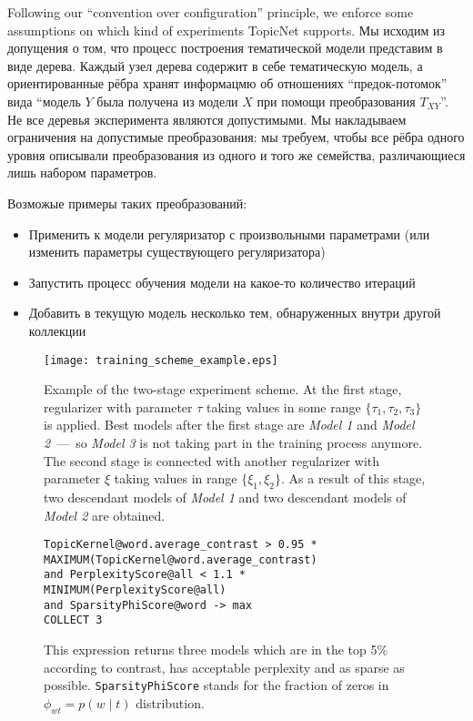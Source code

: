 Following our ``convention over configuration'' principle, we enforce some assumptions on which kind of experiments TopicNet supports. 
Мы исходим из допущения о том, что процесс построения тематической модели представим в виде дерева. Каждый узел дерева содержит в себе тематическую модель, а ориентированные рёбра хранят информацмю об отношениях ``предок-потомок'' вида ``модель $Y$ была получена из модели $X$ при помощи преобразования $T_{XY}$''. Не все деревья эксперимента являются допустимыми. Мы накладываем ограничения на допустимые преобразования: мы требуем, чтобы все рёбра одного уровня описывали преобразования из одного и того же семейства, различающиеся лишь набором параметров. 

\newpage 
Возможые примеры таких преобразований:

\begin{itemize}
    \item Применить к модели регуляризатор с произвольными параметрами (или изменить параметры существующего регуляризатора)
    \item Запустить процесс обучения модели на какое-то количество итераций
    \item Добавить в текущую модель несколько тем, обнаруженных внутри другой коллекции
\end{itemize}

\begin{figure}[t]
    \centering
    \texttt{[image: training\_scheme\_example.eps]}
    \caption{
        Example of the two-stage experiment scheme.
        At the first stage, regularizer with parameter $\tau$ taking values in some range $\{\tau_1, \tau_2, \tau_3\}$ is applied.
        Best models after the first stage are \emph{Model 1} and \emph{Model 2}~---~so \emph{Model 3} is not taking part in the training process anymore.
        The second stage is connected with another regularizer with parameter $\xi$ taking values in range $\{\xi_1, \xi_2\}$.
        As a result of this stage, two descendant models of \emph{Model 1} and two descendant models of \emph{Model 2} are obtained.
    }
\label{Training-scheme}
\end{figure}

\begin{figure*}[!ht]
\footnotesize
\texttt{TopicKernel@word.average\_contrast > 0.95 * MAXIMUM(TopicKernel@word.average\_contrast) \\
\hphantom{\ \ } and PerplexityScore@all < 1.1 * MINIMUM(PerplexityScore@all) \\
\hphantom{\ \ } and SparsityPhiScore@word -> max\\
\hphantom{\ \ } COLLECT 3}
\caption{This expression returns three models which are in the top 5\% according to contrast, has acceptable perplexity and as sparse as possible. \texttt{SparsityPhiScore} stands for the fraction of zeros in $\phi_{wt} = p(w \mid t)$ distribution.}
\label{DSL-example}
\end{figure*}


